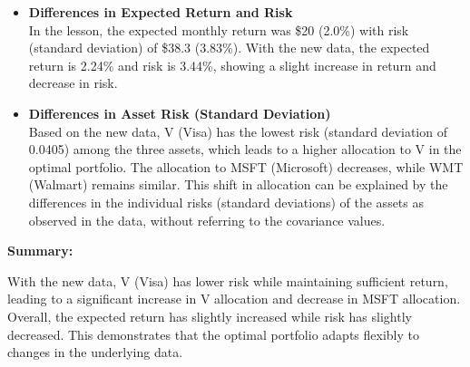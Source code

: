 \documentclass{article}
\begin{document}
\begin{enumerate}
\begin{itemize}
    \item \textbf{Differences in Expected Return and Risk} \\
    In the lesson, the expected monthly return was \$20 (2.0\%) with risk (standard deviation) of \$38.3 (3.83\%). With the new data, the expected return is 2.24\% and risk is 3.44\%, showing a slight increase in return and decrease in risk.
    
    \item \textbf{Differences in Asset Risk (Standard Deviation)} \\
    Based on the new data, V (Visa) has the lowest risk (standard deviation of 0.0405) among the three assets, which leads to a higher allocation to V in the optimal portfolio. The allocation to MSFT (Microsoft) decreases, while WMT (Walmart) remains similar. This shift in allocation can be explained by the differences in the individual risks (standard deviations) of the assets as observed in the data, without referring to the covariance values.
    
\end{itemize}

\textbf{Summary:}

With the new data, V (Visa) has lower risk while maintaining sufficient return, leading to a significant increase in V allocation and decrease in MSFT allocation. Overall, the expected return has slightly increased while risk has slightly decreased. This demonstrates that the optimal portfolio adapts flexibly to changes in the underlying data.

\end{enumerate}
\end{document}

